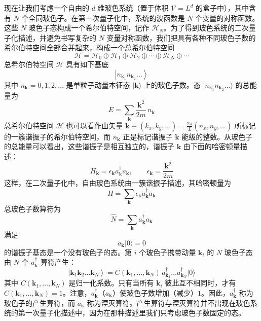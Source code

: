 现在让我们考虑一个自由的 $d$ 维玻色系统（置于体积 $\mathcal{V}=L^d$ 的盒子中），其中含有 $N$ 个全同玻色子。在第一次量子化中，系统的波函数是 $N$ 个变量的对称函数。这些 $N$ 玻色子态构成一个希尔伯特空间，记作 $\mathcal{H}_N$。为了得到玻色系统的二次量子化描述，并避免书写复杂的 $N$ 变量对称函数，我们把具有各种不同玻色子数的希尔伯特空间全部合并起来，构成一个总希尔伯特空间
\begin{equation*}
\mathcal{H}=\mathcal{H}_0\oplus\mathcal{H}_1\oplus\mathcal{H}_2\oplus\cdots\oplus\mathcal{H}_N\oplus\cdots
\end{equation*}
总希尔伯特空间 $\mathcal{H}$ 具有如下基底
\begin{equation*}
\left|n_{\pmb{k}_1}n_{\pmb{k}_2}\ldots\right\rangle
\end{equation*}
其中 $n_{\pmb{k}}=0,1,2,\ldots$ 是单粒子动量本征态 $|\pmb{k}\rangle$ 上的玻色子数。态 $|n_{\pmb{k}_1}n_{\pmb{k}_2}\ldots\rangle$ 的总能量为
\begin{equation*}
E=\sum_{\pmb{k}}\frac{\pmb{k}^2}{2m}\,n_{\pmb{k}}
\end{equation*}
总希尔伯特空间 $\mathcal{H}$ 也可以看作由矢量 $\pmb{k}\equiv(k_x,k_y,\ldots)=\frac{2\pi}{L}(n_x,n_y,\ldots)$ 所标记的一簇谐振子的希尔伯特空间，而 $n_{\pmb{k}}$ 正是标记谐振子 $\pmb{k}$ 能级的整数。从玻色子的总能量可以看出，这些谐振子是相互独立的，谐振子 $\pmb{k}$ 由下面的哈密顿量描述：
\begin{equation*}
H_{\pmb{k}}=\epsilon_{\pmb{k}}a_{\pmb{k}}^{\dagger}a_{\pmb{k}},\qquad \epsilon_{\pmb{k}}=\frac{\pmb{k}^2}{2m}\tag{3.1.1}
\end{equation*}
这样，在二次量子化中，自由玻色系统由一簇谐振子描述，其哈密顿量为
\begin{equation*}
H=\sum_{\pmb{k}}\epsilon_{\pmb{k}}a_{\pmb{k}}^{\dagger}a_{\pmb{k}}
\end{equation*}
总玻色子数算符为
\begin{equation*}
\hat{N}=\sum_{\pmb{k}}a_{\pmb{k}}^{\dagger}a_{\pmb{k}}
\end{equation*}
满足
\begin{equation*}
a_{\pmb{k}}|0\rangle=0
\end{equation*}
的谐振子基态是一个没有玻色子的态。第 $i$ 个玻色子携带动量 $\pmb{k}_i$ 的 $N$ 玻色子态由 $N$ 个 $a_{\pmb{k}}^{\dagger}$ 算符产生：
\begin{equation*}
\left|\pmb{k}_1\pmb{k}_2\ldots\pmb{k}_N\right\rangle=C(\pmb{k}_1,\ldots,\pmb{k}_N)\,a_{\pmb{k}_1}^{\dagger}\ldots a_{\pmb{k}_N}^{\dagger}|0\rangle
\end{equation*}
其中 $C(\pmb{k}_1,\ldots,\pmb{k}_N)$ 是归一化系数。只有当所有 $\pmb{k}_i$ 彼此互不相同时，才有 $C(\pmb{k}_1,\ldots,\pmb{k}_N)=1$。注意，$a_{\pmb{k}}^{\dagger}$（$a_{\pmb{k}}$）使玻色子数增加（减少）$1$。因此，$a_{\pmb{k}}^{\dagger}$ 称为玻色子的产生算符，而 $a_{\pmb{k}}$ 称为湮灭算符。产生算符与湮灭算符并不出现在玻色系统的第一次量子化描述中，因为在那种描述里我们只考虑玻色子数固定的态。

